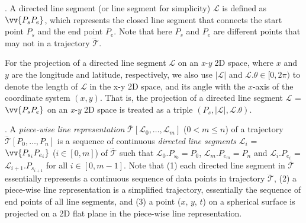 . A directed line segment (or line segment for simplicity) $\mathcal{L}$ is defined as $\vv{P_{s}P_{e}}$, which represents the closed line segment that connects the start point $P_s$ and the end point $P_e$.
Note that here $P_s$ and $P_e$ are different points that may not in a trajectory $\dddot{\mathcal{T}}$.


For the projection of a directed line segment $\mathcal{L}$ on an \emph{x-y} 2D space, where $x$ and $y$ are the longitude and latitude, respectively, we also use $|\mathcal{L}|$ and $\mathcal{L}.\theta\in [0, 2\pi)$ to denote the length of $\mathcal{L}$ in the x-y 2D space, and its angle with the $x$-axis of the coordinate system $(x, y)$.  That is, the projection of a directed line segment $\mathcal{L}$ = $\vv{P_{s}P_{e}}$ on an \emph{x-y} 2D space is treated as a triple $(P_s, |\mathcal{L}|, \mathcal{L}.\theta)$.


. A \textit{piece-wise line representation} $\overline{\mathcal{T}}\left[\mathcal{L}_0, \ldots, \mathcal{L}_m\right]$ ($0< m \le n$) of a trajectory $\dddot{\mathcal{T}}\left[P_0, \ldots, P_n\right]$ is a sequence of continuous \textit{directed line segments} $\mathcal{L}_{i}$ = $\vv{P_{s_i}P_{e_i}}$ ($i\in\left[0,m\right]$) of $\dddot{\mathcal{T}}$ such that $\mathcal{L}_{0}.P_{s_0} = P_0$, $\mathcal{L}_{m}.P_{e_m} = P_n$ and  $\mathcal{L}_{i}.P_{e_i}$ = $\mathcal{L}_{i+1}.P_{s_{i+1}}$ for all $i\in\left[0, m-1\right]$.
Note that (1) each directed line segment in $\overline{\mathcal{T}}$ essentially represents a continuous sequence of data points in trajectory $\dddot{\mathcal{T}}$, (2) a piece-wise line representation is a simplified trajectory, {essentially the sequence of end points of all line segments}, {and (3) a point ($x$, $y$, $t$) on a spherical surface is  projected on a 2D flat plane in the piece-wise line representation.}


